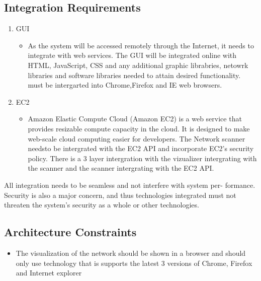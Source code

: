 \documentclass[a4paper,12pt]{report}
\begin{document}
	\subsection{Integration Requirements}
\begin{enumerate}
    \item GUI
\begin{itemize}
    \item As the system will be accessed remotely through the Internet, it needs to
	integrate with web services. The GUI will be integrated online with HTML,
	JavaScript, CSS and any additional graphic librabries, netowrk libraries and software libraries needed to attain desired functionality. must be intergarted into  Chrome,Firefox and IE web browsers.

\end{itemize}
    \item EC2
\begin{itemize}
    \item Amazon Elastic Compute Cloud (Amazon EC2) is a web service that provides resizable compute capacity in the cloud. It is designed to make web-scale cloud computing easier for developers. The Network scanner needsto be intergrated with the EC2 API and incorporate EC2's security policy. There is a 3 layer intergration with the vizualizer  intergrating with the scanner and the scanner intergrating with the EC2 API.


\end{itemize}

\end{enumerate}
	

All integration needs to be seamless and not interfere with system per-
formance. Security is also a major concern, and thus technologies integrated
must not threaten the system's security as a whole or other technologies.	



	\subsection{Architecture Constraints}
\begin{itemize}
    \item The visualization of the network should be shown in a browser and should only use technology that is supports the latest 3 versions of Chrome, Firefox and Internet explorer

\end{itemize}
\end{document}
